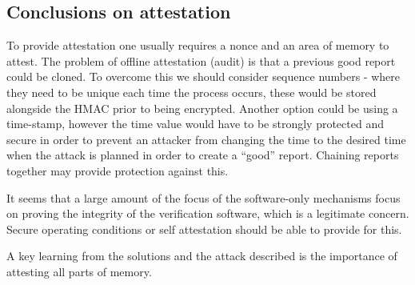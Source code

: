 \subsection{Conclusions on attestation} \label{attestationConclusion}

To provide attestation one usually requires a nonce and an area of memory to attest. The problem of offline attestation (audit) is that a previous good report could be cloned. To overcome this we should consider sequence numbers - where they need to be unique each time the process occurs, these would be stored alongside the HMAC prior to being encrypted. Another option could be using a time-stamp, however the time value would have to be strongly protected and secure in order to prevent an attacker from changing the time to the desired time when the attack is planned in order to create a ``good'' report. Chaining reports together may provide protection against this.

It seems that a large amount of the focus of the software-only mechanisms focus on proving the integrity of the verification software, which is a legitimate concern. Secure operating conditions or self attestation should  be able to provide for this.

A key learning from the solutions and the attack described is the importance of attesting all parts of memory.
